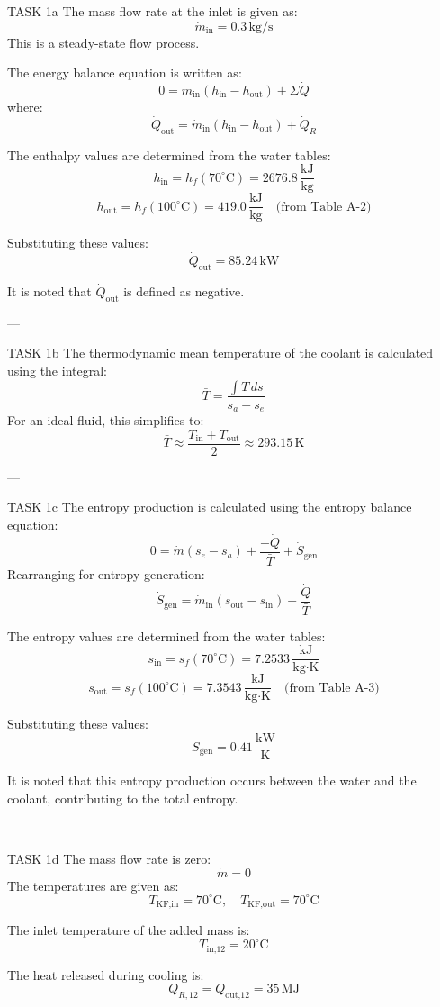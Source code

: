 TASK 1a  
The mass flow rate at the inlet is given as:  
\[
\dot{m}_{\text{in}} = 0.3 \, \text{kg/s}
\]  
This is a steady-state flow process.  

The energy balance equation is written as:  
\[
0 = \dot{m}_{\text{in}} (h_{\text{in}} - h_{\text{out}}) + \Sigma \dot{Q}
\]  
where:  
\[
\dot{Q}_{\text{out}} = \dot{m}_{\text{in}} (h_{\text{in}} - h_{\text{out}}) + \dot{Q}_R
\]  

The enthalpy values are determined from the water tables:  
\[
h_{\text{in}} = h_f(70^\circ\text{C}) = 2676.8 \, \frac{\text{kJ}}{\text{kg}}
\]  
\[
h_{\text{out}} = h_f(100^\circ\text{C}) = 419.0 \, \frac{\text{kJ}}{\text{kg}} \quad \text{(from Table A-2)}
\]  

Substituting these values:  
\[
\dot{Q}_{\text{out}} = 85.24 \, \text{kW}
\]  

It is noted that \(\dot{Q}_{\text{out}}\) is defined as negative.  

---

TASK 1b  
The thermodynamic mean temperature of the coolant is calculated using the integral:  
\[
\bar{T} = \frac{\int T \, ds}{s_a - s_e}
\]  
For an ideal fluid, this simplifies to:  
\[
\bar{T} \approx \frac{T_{\text{in}} + T_{\text{out}}}{2} \approx 293.15 \, \text{K}
\]  

---

TASK 1c  
The entropy production is calculated using the entropy balance equation:  
\[
0 = \dot{m} (s_e - s_a) + \frac{-\dot{Q}}{\bar{T}} + \dot{S}_{\text{gen}}
\]  
Rearranging for entropy generation:  
\[
\dot{S}_{\text{gen}} = \dot{m}_{\text{in}} (s_{\text{out}} - s_{\text{in}}) + \frac{\dot{Q}}{\bar{T}}
\]  

The entropy values are determined from the water tables:  
\[
s_{\text{in}} = s_f(70^\circ\text{C}) = 7.2533 \, \frac{\text{kJ}}{\text{kg·K}}
\]  
\[
s_{\text{out}} = s_f(100^\circ\text{C}) = 7.3543 \, \frac{\text{kJ}}{\text{kg·K}} \quad \text{(from Table A-3)}
\]  

Substituting these values:  
\[
\dot{S}_{\text{gen}} = 0.41 \, \frac{\text{kW}}{\text{K}}
\]  

It is noted that this entropy production occurs between the water and the coolant, contributing to the total entropy.  

---

TASK 1d  
The mass flow rate is zero:  
\[
\dot{m} = 0
\]  
The temperatures are given as:  
\[
T_{\text{KF,in}} = 70^\circ\text{C}, \quad T_{\text{KF,out}} = 70^\circ\text{C}
\]  

The inlet temperature of the added mass is:  
\[
T_{\text{in,12}} = 20^\circ\text{C}
\]  

The heat released during cooling is:  
\[
Q_{R,12} = Q_{\text{out,12}} = 35 \, \text{MJ}
\]  